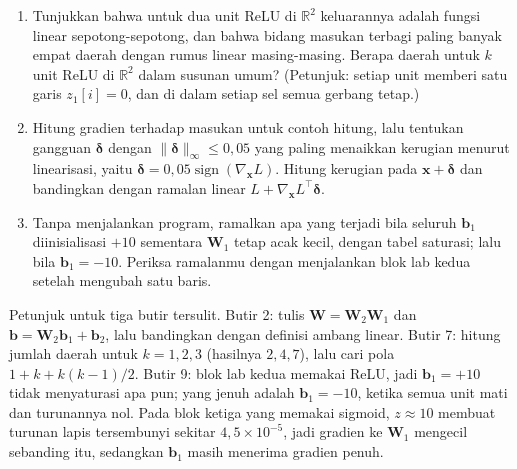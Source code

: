 \begin{latihan}
\begin{enumerate}
  \item Tunjukkan bahwa untuk dua unit ReLU di $\mathbb{R}^{2}$ keluarannya adalah fungsi
        linear sepotong-sepotong, dan bahwa bidang masukan terbagi paling banyak empat
        daerah dengan rumus linear masing-masing. Berapa daerah untuk $k$ unit ReLU di
        $\mathbb{R}^{2}$ dalam susunan umum? (Petunjuk: setiap unit memberi satu garis
        $z_{1}[i]=0$, dan di dalam setiap sel semua gerbang tetap.)

  \item Hitung gradien terhadap masukan untuk contoh hitung, lalu tentukan gangguan
        $\boldsymbol{\delta}$ dengan $\lVert\boldsymbol{\delta}\rVert_{\infty}\le0{,}05$
        yang paling menaikkan kerugian menurut linearisasi, yaitu
        $\boldsymbol{\delta}=0{,}05\operatorname{sign}(\nabla_{\mathbf{x}}L)$. Hitung kerugian pada $\mathbf{x}+\boldsymbol{\delta}$ dan bandingkan dengan ramalan linear $L+\nabla_{\mathbf{x}}L^{\top}\boldsymbol{\delta}$.

  \item Tanpa menjalankan program, ramalkan apa yang terjadi bila seluruh $\mathbf{b}_{1}$ diinisialisasi $+10$ sementara $\mathbf{W}_{1}$ tetap acak kecil, dengan tabel saturasi; lalu bila $\mathbf{b}_{1}=-10$. Periksa ramalanmu dengan menjalankan blok lab kedua setelah mengubah satu baris.
\end{enumerate}
\end{latihan}

Petunjuk untuk tiga butir tersulit. Butir 2: tulis $\mathbf{W}=\mathbf{W}_{2}\mathbf{W}_{1}$ dan $\mathbf{b}=\mathbf{W}_{2}\mathbf{b}_{1}+\mathbf{b}_{2}$, lalu bandingkan dengan definisi ambang linear. Butir 7: hitung jumlah daerah untuk $k=1,2,3$ (hasilnya $2,4,7$), lalu cari pola $1+k+k(k-1)/2$. Butir 9: blok lab kedua memakai ReLU, jadi $\mathbf{b}_{1}=+10$ tidak menyaturasi apa pun; yang jenuh adalah $\mathbf{b}_{1}=-10$, ketika semua unit mati dan turunannya nol. Pada blok ketiga yang memakai sigmoid, $z\approx10$ membuat turunan lapis tersembunyi sekitar $4{,}5\times10^{-5}$, jadi gradien ke $\mathbf{W}_{1}$ mengecil sebanding itu, sedangkan $\mathbf{b}_{1}$ masih menerima gradien penuh.

